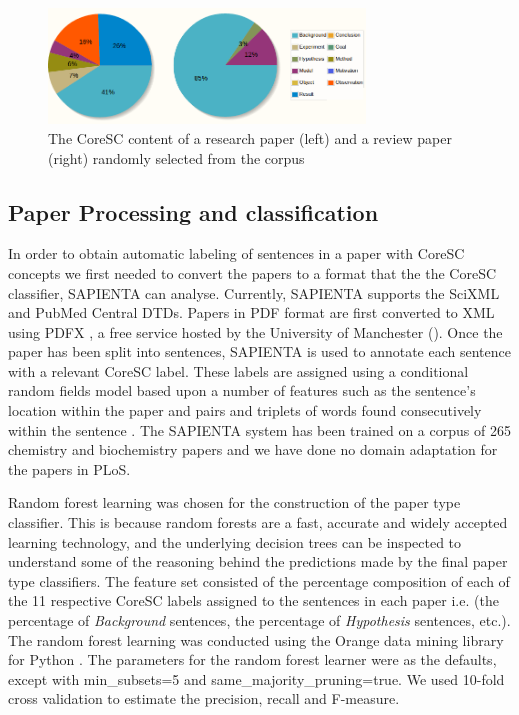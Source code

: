 \documentclass{svmult}
\begin{document}
\begin{figure}[t]
\centering
\includegraphics[width=0.75\textwidth]{figures/corescs.png}
\caption{The CoreSC content of a research paper (left) and a review paper (right) randomly selected from the corpus}
\vspace{-20pt}
\label{fig:coresc_pies} 
\end{figure}

\subsection*{Paper Processing and classification}
\vspace{-15pt}

In order to obtain automatic labeling of sentences in a paper with
CoreSC concepts we first needed to convert the papers to a format that
the the CoreSC classifier, SAPIENTA can analyse.  Currently, SAPIENTA
supports the SciXML and PubMed Central DTDs.  Papers in PDF format are
first converted to XML using PDFX %
, a free service hosted by the University of Manchester
(\cite{Constantin2013}). Once the paper has been split into
sentences, SAPIENTA is used to annotate each sentence with a relevant
CoreSC label. These labels are assigned using a conditional random
fields model based upon a number of features such as the sentence's
location within the paper and pairs and triplets of words found
consecutively within the sentence \cite{Liakata2012}.  The SAPIENTA
system has been trained on a corpus of 265 chemistry and biochemistry
papers and we have done no domain adaptation for the papers in PLoS.






Random forest learning\cite{Breiman2001} was chosen for the construction of the
paper type classifier. This is because random forests are a fast, accurate and
widely accepted learning technology, and the underlying decision trees can be
inspected to understand some of the reasoning behind the predictions made by
the final paper type classifiers. The feature set consisted of the percentage
composition of each of the 11 respective CoreSC labels assigned to the
sentences in each paper i.e. (the percentage of {\em Background} sentences, the
percentage of {\em Hypothesis} sentences, etc.). The random forest learning was
conducted using the Orange data mining library for Python \cite{Curk2005}.  The
parameters for the random forest learner were as the defaults, except with
min\_subsets=5 and same\_majority\_pruning=true.  We used 10-fold cross
validation to estimate the precision, recall and F-measure.
\end{document}
